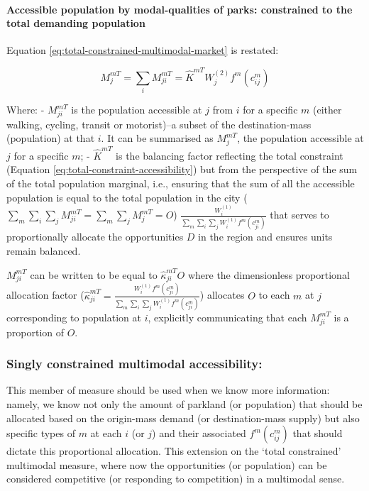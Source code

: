 \documentclass[
11pt, %
oneside, %
english, %
singlespacing, %
]{macthesis} %
\begin{document}
\paragraph{Accessible population by modal-qualities of parks: constrained to the total demanding population}\label{accessible-population-by-modal-qualities-of-parks-constrained-to-the-total-demanding-population}

Equation \ref{eq:total-constrained-multimodal-market} is restated:

\begin{equation}
\label{eq:total-constrained-multimodal-market}
M^{mT}_{j} = \sum_i M^{mT}_{ji} = \hat K^{mT} W_j^{(2)} f^m(c^m_{ij})
\end{equation} 

Where:
- \(M^{mT}_{ji}\) is the population accessible at \(j\) from \(i\) for a specific \(m\) (either walking, cycling, transit or motorist)--a subset of the destination-mass (population) at that \(i\). It can be summarised as \(M^{mT}_{j}\), the population accessible at \(j\) for a specific \(m\);
- \(\hat K^{mT}\) is the balancing factor reflecting the total constraint (Equation \ref{eq:total-constraint-accessibility}) but from the perspective of the sum of the total population marginal, i.e., ensuring that the sum of all the accessible population is equal to the total population in the city (\(\sum_m \sum_i\sum_j M^{mT}_{ji} = \sum_m \sum_j M^{mT}_{j} = O\)) \(\frac{W^{(1)}_i}{\sum_m\sum_i\sum_j W^{(1)}_if^m(c^m_{ji})}\) that serves to proportionally allocate the opportunities \(D\) in the region and ensures units remain balanced.

\(M_{ji}^{mT}\) can be written to be equal to \(\hat \kappa_{ji}^{mT} O\) where the dimensionless proportional allocation factor (\(\hat \kappa_{ji}^{mT} = \frac{W_i^{(1)} f^m(c^m_{ji})}{\sum_m\sum_i\sum_j W^{(1)}_if^m(c^m_{ji})}\)) allocates \(O\) to each \(m\) at \(j\) corresponding to population at \(i\), explicitly communicating that each \(M_{ji}^{mT}\) is a proportion of \(O\).

\subsubsection{Singly constrained multimodal accessibility:}\label{singly-constrained-multimodal-accessibility}

This member of measure should be used when we know more information: namely, we know not only the amount of parkland (or population) that should be allocated based on the origin-mass demand (or destination-mass supply) but also specific types of \(m\) at each \(i\) (or \(j\)) and their associated \(f^m(c^m_{ij})\) that should dictate this proportional allocation. This extension on the `total constrained' multimodal measure, where now the opportunities (or population) can be considered competitive (or responding to competition) in a multimodal sense.
\end{document}
